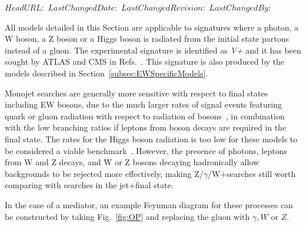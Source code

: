 \svnidlong
{$HeadURL: $}
{$LastChangedDate: $}
{$LastChangedRevision: $}
{$LastChangedBy: $}

All models detailed in this Section are applicable to signatures where 
a photon, a W boson, a Z boson or a Higgs boson
is radiated from the initial state partons instead of a gluon. 
The experimental signature is identified as \textit{V+\MET} and it
has been sought by ATLAS and CMS in Refs.~\cite{Khachatryan:2014rwa,Aad:2014tda,Khachatryan:2014tva,ATLAS:2014wra,Aad:2013oja,Aad:2014vka}. 
This signature is also produced by the models described in 
Section~\ref{subsec:EWSpecificModels}. 

Monojet searches are generally more sensitive
with respect to final states including EW bosons, due to the much
larger rates of signal events featuring quark or gluon radiation with
respect to radiation of bosons~\cite{Zhou:2013fla},
in combination with the low branching ratios if leptons from
boson decays are required in the final state.
The rates for the Higgs boson radiation is too low for these models
to be considered a viable benchmark~\cite{Carpenter:2013xra}.
However, the presence of photons,
leptons from W and Z decays,
and W or Z bosons decaying hadronically
allow backgrounds to be rejected more effectively,
making Z/$\gamma$/W+\MET searches
still worth comparing with searches in the jet+\MET final state.

In the case of a \spinone mediator,
an example Feynman diagram for these processes can be constructed by taking
Fig.~\ref{fig:OP} and replacing the gluon with $\gamma,W$ or $Z$.

